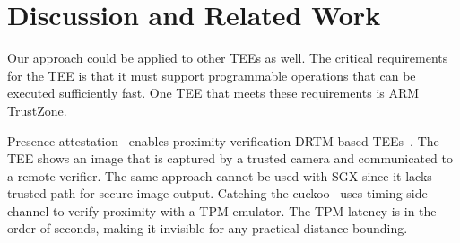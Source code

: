 
\section{Discussion and Related Work}
\label{sec:discussion_proximitee}

{} Our approach could be applied to other TEEs as well. The critical requirements for the TEE is that it must support programmable operations that can be executed sufficiently fast. One TEE that meets these requirements is ARM TrustZone. %


Presence attestation~\cite{presenceAttestation} enables proximity verification DRTM-based TEEs~\cite{mccune2008flicker}. The TEE shows an image that is captured by a trusted camera and communicated to a remote verifier. The same approach cannot be used with SGX since it lacks trusted path for secure image output. Catching the cuckoo~\cite{CatchingCuckoo} uses timing side channel to verify proximity with a TPM emulator. The TPM latency is in the order of seconds, making it invisible for any practical distance bounding. 
